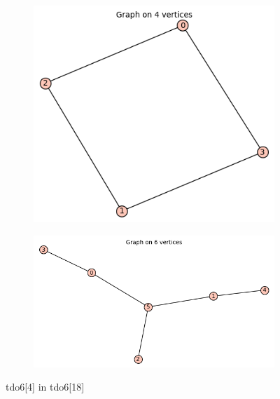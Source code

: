 \documentclass[12pt, a4paper]{article}
\begin{document}
\begin{center}
\begin{figure}[!htb]
\centering
\begin{subfigure}{0.5\textwidth}
  \centering
  \includegraphics[width=0.6\linewidth]{tdo6[4]}
\end{subfigure}%
\begin{subfigure}{0.5\textwidth}
  \centering
  \includegraphics[width=0.9\linewidth]{tdo6[18]}
\end{subfigure}
\caption{tdo6[4] in tdo6[18]}
\label{fig:test}
\end{figure}


\end{center}
\end{document}
